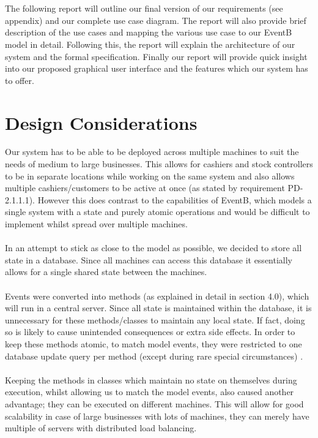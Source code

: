 \documentclass[a4paper]{article}
\begin{document}
\\\\
The following report will outline our final version of our requirements (see appendix) and our complete use case diagram. The report will also provide brief description of the use cases and mapping the various use case to our EventB model in detail. Following this, the report will explain the architecture of our system and the formal specification. Finally our report will provide quick insight into our proposed graphical user interface and the features which our system has to offer.
\pagebreak

\section{Design Considerations}
Our system has to be able to be deployed across multiple machines to suit the needs of medium to large businesses. This allows for cashiers and stock controllers to be in separate locations while working on the same system and also allows multiple cashiers/customers to be active at once (as stated by requirement PD-2.1.1.1). However this does contrast to the capabilities of EventB, which models a single system with a state and purely atomic operations and would be difficult to implement whilst spread over multiple machines.
\\\\
In an attempt to stick as close to the model as possible, we decided to store all state in a database. Since all machines can access this database it essentially allows for a single shared state between the machines.
\\\\
Events were converted into methods (as explained in detail in section 4.0), which will run in a central server. Since all state is maintained within the database, it is unnecessary for these methods/classes to maintain any local state. If fact, doing so is likely to cause unintended consequences or extra side effects. In order to keep these methods atomic, to match model events, they were restricted to one database update query per method (except during rare special circumstances) .
\\\\
Keeping the methods in classes which maintain no state on themselves during execution, whilst allowing us to match the model events, also caused another advantage; they can be executed on different machines. This will allow for good scalability in case of large businesses with lots of machines, they can merely have multiple of servers with distributed load balancing. 
\end{document}
